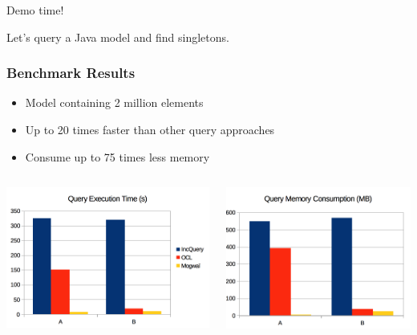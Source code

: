 \documentclass[10pt]{beamer}
\begin{document}
\begin{frame}[standout]
  Demo time!

  Let's query a Java model and find singletons.
\end{frame}

\begin{frame}[c]\frametitle{Benchmark Results}
\begin{itemize}
	\item Model containing 2 million elements
	\item Up to 20 times faster than other query approaches
	\item Consume up to 75 times less memory
\end{itemize}
\begin{columns}
	\begin{column}{0.5\textwidth}
	    \begin{center}
	      \includegraphics[width=\textwidth]{mogwai-benchmark-cpu.png}
	    \end{center}
	\end{column}
	\begin{column}{0.5\textwidth}
	    \begin{center}
	      \includegraphics[width=\textwidth]{mogwai-benchmark-memory.png}
	    \end{center}
	\end{column}
\end{columns}



\end{frame}
\end{document}
